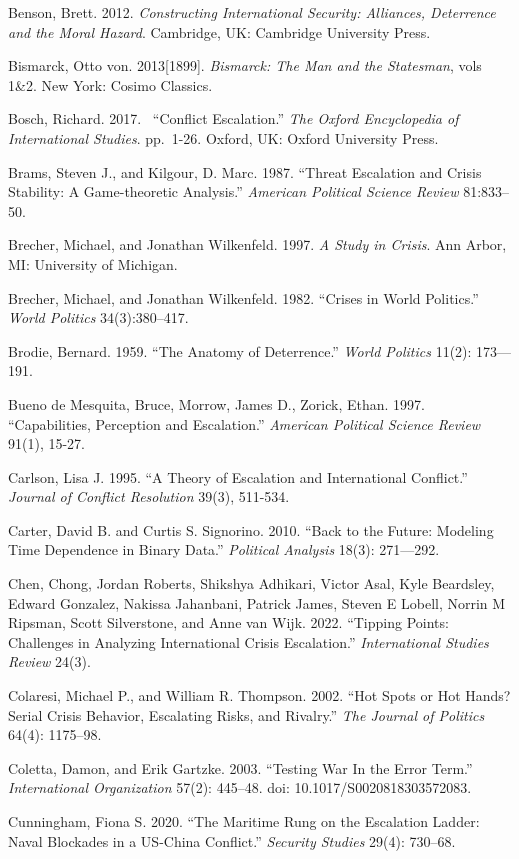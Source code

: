 \documentclass[
  letterpaper,
  DIV=11,
  numbers=noendperiod]{scrartcl}
\begin{document}
Benson, Brett. 2012. \emph{Constructing International Security:
Alliances, Deterrence and the Moral Hazard}. Cambridge, UK: Cambridge
University Press.

Bismarck, Otto von. 2013{[}1899{]}. \emph{Bismarck: The Man and the
Statesman}, vols 1\&2. New York: Cosimo Classics.

Bosch, Richard. 2017.~ ``Conflict Escalation.'' \emph{The Oxford
Encyclopedia of International Studies}. pp.~1-26. Oxford, UK: Oxford
University Press.

Brams, Steven J., and Kilgour, D. Marc. 1987. ``Threat Escalation and
Crisis Stability: A Game-theoretic Analysis.'' \emph{American Political
Science Review} 81:833--50.

Brecher, Michael, and Jonathan Wilkenfeld. 1997. \emph{A Study in
Crisis}. Ann Arbor, MI: University of Michigan.~

Brecher, Michael, and Jonathan Wilkenfeld. 1982. ``Crises in World
Politics.'' \emph{World Politics} 34(3):380--417.

Brodie, Bernard. 1959. ``The Anatomy of Deterrence.'' \emph{World
Politics} 11(2): 173---191.

Bueno de Mesquita, Bruce, Morrow, James D., Zorick, Ethan. 1997.
``Capabilities, Perception and Escalation.'' \emph{American Political
Science Review} 91(1), 15-27.

Carlson, Lisa J. 1995. ``A Theory of Escalation and International
Conflict.'' \emph{Journal of Conflict Resolution} 39(3), 511-534.

Carter, David B. and Curtis S. Signorino. 2010. ``Back to the Future:
Modeling Time Dependence in Binary Data.'' \emph{Political Analysis}
18(3): 271---292.

Chen, Chong, Jordan Roberts, Shikshya Adhikari, Victor Asal, Kyle
Beardsley, Edward Gonzalez, Nakissa Jahanbani, Patrick James, Steven E
Lobell, Norrin M Ripsman, Scott Silverstone, and Anne van Wijk. 2022.
``Tipping Points: Challenges in Analyzing International Crisis
Escalation.'' \emph{International Studies Review} 24(3).

Colaresi, Michael P., and William R. Thompson. 2002. ``Hot Spots or Hot
Hands? Serial Crisis Behavior, Escalating Risks, and Rivalry.''
\emph{The Journal of Politics} 64(4): 1175--98.

Coletta, Damon, and Erik Gartzke. 2003. ``Testing War In the Error
Term.'' \emph{International Organization} 57(2): 445--48. doi:
10.1017/S0020818303572083.

Cunningham, Fiona S. 2020. ``The Maritime Rung on the Escalation Ladder:
Naval Blockades in a US-China Conflict.'' \emph{Security Studies} 29(4):
730--68.
\end{document}
